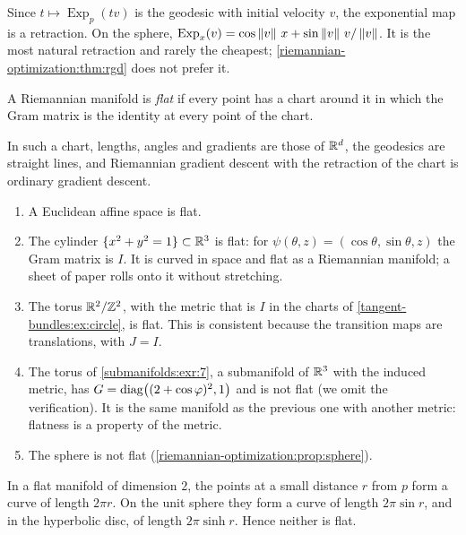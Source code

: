 \begin{notechapter}
Since $t\mapsto\operatorname{Exp}_p(tv)$ is the geodesic with initial
velocity $v$, the exponential map is a retraction. On the sphere,
$\operatorname{Exp}_x(v) = \cos\left\|v\right\|\,x
+ \sin\left\|v\right\|\,v/\left\|v\right\|$. It is the most natural retraction and rarely
the cheapest; \cref{riemannian-optimization:thm:rgd} does not prefer it.

\begin{definition}[Flat]\label{riemannian-optimization:def:flat}
A Riemannian manifold is \emph{flat} if every point has a chart around it
in which the Gram matrix is the identity at every point of the chart.
\end{definition}

In such a chart, lengths, angles and gradients are those of $\mathbb{R}^d$, the
geodesics are straight lines, and Riemannian gradient descent with the
retraction of the chart is ordinary gradient descent.

\begin{example}\label{riemannian-optimization:ex:flat}
\begin{enumerate}[nosep]
  \item A Euclidean affine space is flat.
  \item The cylinder $\{x^2 + y^2 = 1\}\subset\mathbb{R}^3$ is flat: for
        $\psi(\theta, z) = (\cos\theta, \sin\theta, z)$ the Gram matrix is
        $I$. It is curved in space and flat as a Riemannian manifold; a
        sheet of paper rolls onto it without stretching.
  \item The torus $\mathbb{R}^2/\mathbb{Z}^2$, with the metric that is $I$ in the charts
        of \cref{tangent-bundles:ex:circle}, is flat. This is consistent
        because the transition maps are translations, with $J = I$.
  \item The torus of \cref{submanifolds:exr:7}, a submanifold of $\mathbb{R}^3$
        with the induced metric, has
        $G = \operatorname{diag}\bigl((2 + \cos\varphi)^2, 1\bigr)$ and is not flat
        (we omit the verification). It is the same manifold as the
        previous one with another metric: flatness is a property of the
        metric.
  \item The sphere is not flat
        (\cref{riemannian-optimization:prop:sphere}).
\end{enumerate}
\end{example}

\begin{proposition}
\label{riemannian-optimization:prop:sphere}
In a flat manifold of dimension $2$, the points at a small distance $r$
from $p$ form a curve of length $2\pi r$. On the unit sphere they form a
curve of length $2\pi\sin r$, and in the hyperbolic disc, of length
$2\pi\sinh r$. Hence neither is flat.
\end{proposition}


\end{notechapter}
